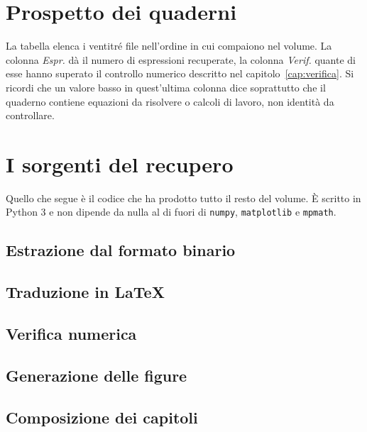 \chapter{Prospetto dei quaderni}
\label{app:prospetto}

La tabella elenca i ventitr\'e file nell'ordine in cui compaiono nel volume.
La colonna \emph{Espr.} d\`a il numero di espressioni recuperate, la colonna
\emph{Verif.} quante di esse hanno superato il controllo numerico descritto
nel capitolo~\ref{cap:verifica}. Si ricordi che un valore basso in
quest'ultima colonna dice soprattutto che il quaderno contiene equazioni da
risolvere o calcoli di lavoro, non identit\`a da controllare.



\chapter{I sorgenti del recupero}
\label{app:sorgenti}

Quello che segue \`e il codice che ha prodotto tutto il resto del volume.
\`E scritto in Python 3 e non dipende da nulla al di fuori di
\texttt{numpy}, \texttt{matplotlib} e \texttt{mpmath}.

\section{Estrazione dal formato binario}


\section{Traduzione in \LaTeX}


\section{Verifica numerica}


\section{Generazione delle figure}


\section{Composizione dei capitoli}

